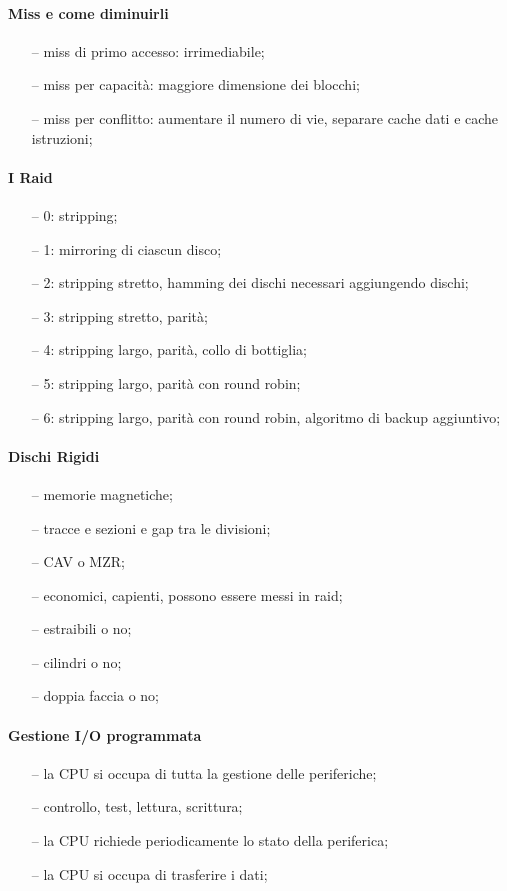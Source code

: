 \documentclass{article}
\begin{document}
\paragraph{Miss e come diminuirli}
\begin{itemize}
	\item[--] miss di primo accesso: irrimediabile;
	\item[--] miss per capacità: maggiore dimensione dei blocchi;
	\item[--] miss per conflitto: aumentare il numero di vie, separare cache dati e cache istruzioni;
\end{itemize}

\paragraph{I Raid}
\begin{itemize}
	\item[--] 0: stripping;
	\item[--] 1: mirroring di ciascun disco;
	\item[--] 2: stripping stretto, hamming dei dischi necessari aggiungendo dischi;
	\item[--] 3: stripping stretto, parità;
	\item[--] 4: stripping largo, parità, collo di bottiglia;
	\item[--] 5: stripping largo, parità con round robin;
	\item[--] 6: stripping largo, parità con round robin, algoritmo di backup aggiuntivo;
\end{itemize}

\paragraph{Dischi Rigidi}
\begin{itemize}
	\item[--] memorie magnetiche;
	\item[--] tracce e sezioni e gap tra le divisioni;
	\item[--] CAV o MZR;
	\item[--] economici, capienti, possono essere messi in raid;
	\item[--] estraibili o no;
	\item[--] cilindri o no;
	\item[--] doppia faccia o no;
\end{itemize}

\paragraph{Gestione I/O programmata}
\begin{itemize}
	\item[--] la CPU si occupa di tutta la gestione delle periferiche;
	\item[--] controllo, test, lettura, scrittura;
	\item[--] la CPU richiede periodicamente lo stato della periferica;
	\item[--] la CPU si occupa di trasferire i dati;
\end{itemize}
\end{document}
